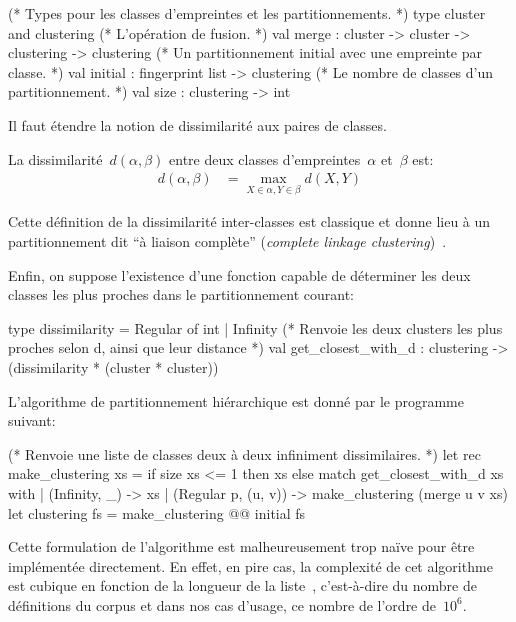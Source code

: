 \begin{ocaml}
(* Types pour les classes d'empreintes et les partitionnements. *)
type cluster and clustering
(* L'opération de fusion. *)
val merge : cluster -> cluster -> clustering -> clustering
(* Un partitionnement initial avec une empreinte par classe. *)
val initial : fingerprint list -> clustering
(* Le nombre de classes d'un partitionnement. *)
val size : clustering -> int
\end{ocaml}

Il faut étendre la notion de dissimilarité aux paires de classes.

\begin{defn}
La dissimilarité~$d(\alpha, \beta)$ entre deux classes
d'empreintes~$\alpha$ et~$\beta$ est:
\begin{align*}
d(\alpha,\beta) &= \max\limits_{X \in \alpha, Y \in \beta} d(X,Y)
\end{align*}
\end{defn}

Cette définition de la dissimilarité inter-classes est classique et
donne lieu à un partitionnement dit ``à liaison complète'' (\emph{complete
  linkage clustering})~\cite{DBLP:books/crc/aggarwal13/ReddyV13}.

Enfin, on suppose l'existence d'une fonction capable de déterminer
les deux classes les plus proches dans le partitionnement courant:

\begin{ocaml}
type dissimilarity = Regular of int | Infinity
(* Renvoie les deux clusters les plus proches selon d, ainsi que leur distance *)
val get_closest_with_d : clustering -> (dissimilarity * (cluster * cluster))
\end{ocaml}

L'algorithme de partitionnement hiérarchique est donné par le programme {\OCaml} suivant:

\begin{ocaml}
(* Renvoie une liste de classes deux à deux infiniment dissimilaires. *)
let rec make_clustering xs =
  if size xs <= 1 then xs else match get_closest_with_d xs with
   | (Infinity, _) -> xs
   | (Regular p, (u, v)) -> make_clustering (merge u v xs)
let clustering fs = make_clustering @@ initial fs
\end{ocaml}

Cette formulation de l'algorithme est malheureusement trop naïve pour
être implémentée directement. En effet, en pire cas, la complexité de
cet algorithme est cubique en fonction de la longueur de la
liste~, c'est-à-dire du nombre de définitions du
corpus et dans nos cas d'usage, ce nombre de l'ordre de~$10^6$.

